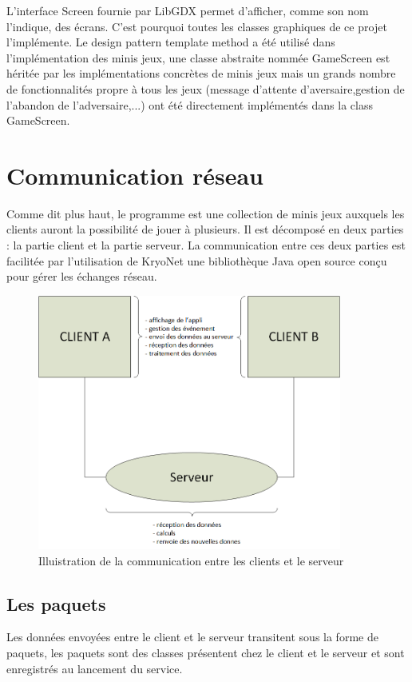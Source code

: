 \documentclass{report}
\begin{document}
L'interface Screen fournie par LibGDX permet d'afficher, comme son nom l'indique, des écrans. C'est pourquoi toutes les classes graphiques de ce
projet l'implémente. Le design pattern template method a été utilisé dans l'implémentation des minis jeux, une classe abstraite nommée GameScreen est héritée
par les implémentations concrètes de minis jeux mais un grands nombre de fonctionnalités propre à tous les jeux (message d'attente d'aversaire,gestion de l'abandon de l'adversaire,...)
ont été directement implémentés dans la class GameScreen.

\chapter{Communication réseau}
Comme dit plus haut, le programme est une collection de minis jeux auxquels les clients auront la possibilité de jouer à
plusieurs. Il est décomposé en deux parties : la partie client et la partie serveur. La communication entre ces
deux parties est facilitée par l'utilisation de KryoNet une bibliothèque Java open source conçu pour gérer les échanges réseau.

\begin{figure}[H]
	\centering\includegraphics[width=10cm]{maquette_Base}
	\caption{Illuistration de la communication entre les clients et le serveur}
\end{figure}


\section{Les paquets}
Les données envoyées entre le client et le serveur transitent sous la forme de paquets, les paquets sont des classes présentent
chez le client et le serveur et sont enregistrés au lancement du service.
\end{document}
